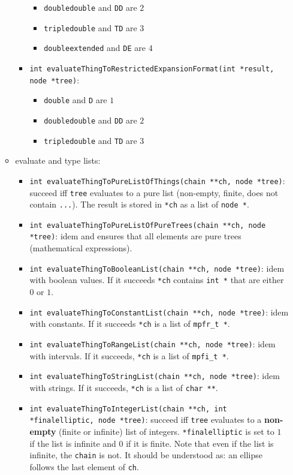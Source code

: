 \documentclass{article}
\begin{document}
\begin{itemize}
\begin{itemize}
\begin{itemize}
\begin{itemize}
      \item \texttt{doubledouble} and \texttt{DD} are $2$ 
      \item \texttt{tripledouble} and \texttt{TD} are $3$ 
      \item \texttt{doubleextended} and \texttt{DE} are $4$ 
      \end{itemize}
    \item \texttt{int evaluateThingToRestrictedExpansionFormat(int *result, node *tree)}:
      \begin{itemize}
      \item \texttt{double} and \texttt{D} are $1$
      \item \texttt{doubledouble} and \texttt{DD} are $2$ 
      \item \texttt{tripledouble} and \texttt{TD} are $3$ 
      \end{itemize}
    \end{itemize}
  \item evaluate and type lists:
    \begin{itemize}
    \item \texttt{int evaluateThingToPureListOfThings(chain **ch, node *tree)}: succeed iff \texttt{tree} evaluates to a pure list (non-empty, finite, does not contain \texttt{...}). The result is stored in \texttt{*ch} as a list of \texttt{node *}.
    \item \texttt{int evaluateThingToPureListOfPureTrees(chain **ch, node *tree)}: idem and ensures that all elements are pure trees (mathematical expressions).
    \item \texttt{int evaluateThingToBooleanList(chain **ch, node *tree)}: idem with boolean values. If it succeeds \texttt{*ch} contains \texttt{int *} that are either $0$ or $1$.
    \item \texttt{int evaluateThingToConstantList(chain **ch, node *tree)}: idem with constants. If it succeeds \texttt{*ch} is a list of \texttt{mpfr\_t *}.
    \item \texttt{int evaluateThingToRangeList(chain **ch, node *tree)}: idem with intervals. If it succeeds, \texttt{*ch} is a list of \texttt{mpfi\_t *}.
    \item \texttt{int evaluateThingToStringList(chain **ch, node *tree)}: idem with strings. If it succeeds,  \texttt{*ch} is a list of \texttt{char **}.
    \item \texttt{int evaluateThingToIntegerList(chain **ch, int *finalelliptic, node *tree)}: succeed iff \texttt{tree} evaluates to a \textbf{non-empty} (finite or infinite) list of integers. \texttt{*finalelliptic} is set to $1$ if the list is infinite and $0$ if it is finite. Note that even if the list is infinite, the \texttt{chain} is not. It should be understood as: an ellipse follows the last element of \texttt{ch}.

\end{itemize}
\end{itemize}
\end{itemize}
\end{document}
